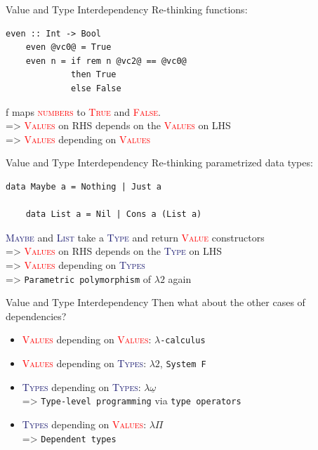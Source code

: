 \documentclass[xcolor={usenames,dvipsnames}]{beamer}
\newcommand{\htycon}[1]{\textcolor{MidnightBlue}{\textsc{#1}}}
\newcommand{\hvalcon}[1]{\textcolor{Red}{\textsc{#1}}}
\begin{document}
\begin{frame}[fragile]{Value and Type Interdependency}
  Re-thinking functions:
  \begin{lstlisting}[style=hask]
    even :: Int -> Bool
    even @vc0@ = True
    even n = if rem n @vc2@ == @vc0@
             then True
             else False
  \end{lstlisting}

  \qquad f maps \hvalcon{numbers} to \hvalcon{True} and \hvalcon{False}.
  \ \\
  \pause
  => \hvalcon{Values} on RHS depends on the \hvalcon{Values} on LHS
  \ \\
  \pause
  => \hvalcon{Values} depending on \hvalcon{Values}
\end{frame}

\begin{frame}[fragile]{Value and Type Interdependency}
  Re-thinking parametrized data types:
  \begin{lstlisting}[style=hask]
    data Maybe a = Nothing | Just a

    data List a = Nil | Cons a (List a)
  \end{lstlisting}

  \pause
  \qquad \htycon{Maybe} and \htycon{List} take a \htycon{Type} and return \hvalcon{Value} constructors
  \ \\
  \pause
  => \hvalcon{Values} on RHS depends on the \htycon{Type} on LHS
  \ \\
  \pause
  => \hvalcon{Values} depending on \htycon{Types}
  \ \\
  \pause
  => \texttt{Parametric polymorphism} of $\lambda2$ again

\end{frame}

\begin{frame}[fragile]{Value and Type Interdependency}
  Then what about the other cases of dependencies?
  \pause
  \begin{itemize}
    \item \hvalcon{Values} depending on \hvalcon{Values}: \texttt{$\lambda$-calculus}
    \pause
    \item \hvalcon{Values} depending on \htycon{Types}: $\lambda2$, \texttt{System F}
    \pause
    \item \htycon{Types} depending on \htycon{Types}: \pause$\lambda\underline\omega$\\
      => \texttt{Type-level programming} via \texttt{type operators}
    \pause
    \item \htycon{Types} depending on \hvalcon{Values}: \pause$\lambda\Pi$\\
      => \texttt{Dependent types}
  \end{itemize}
\end{frame}
\end{document}

